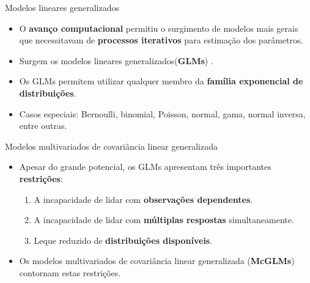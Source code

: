 \documentclass[
  ignorenonframetext,
  serif,
  professionalfont,
  usenames,
  dvipsnames,
  aspectratio = 169]{beamer}
\begin{document}
\begin{frame}{Modelos lineares generalizados}
\protect\hypertarget{modelos-lineares-generalizados}{}
\begin{itemize}
    \itemsep 2ex

  \item O \textbf{avanço computacional} permitiu o surgimento de modelos mais gerais que necessitavam de \textbf{processos iterativos} para estimação dos parâmetros. 
  
  \item Surgem os modelos lineares generalizados(\textbf{GLMs}) \citep{Nelder72}. 
  
  \item Os GLMs permitem utilizar qualquer membro da \textbf{família exponencial de distribuições}.

  \item Casos especiais: Bernoulli, binomial, Poisson, normal, gama, normal inversa, entre outras.
  
  \end{itemize}
\end{frame}

\begin{frame}{Modelos multivariados de covariância linear generalizada}
\protect\hypertarget{modelos-multivariados-de-covariuxe2ncia-linear-generalizada}{}
\begin{itemize}
    \itemsep 2ex
  
  \item Apesar do grande potencial, os GLMs apresentam três importantes \textbf{restrições}:
    \begin{enumerate}
      \itemsep 2ex
    
      \item A incapacidade de lidar com \textbf{observações dependentes}. 
      \item A incapacidade de lidar com \textbf{múltiplas respostas} simultaneamente.
      \item Leque reduzido de \textbf{distribuições disponíveis}. 
    \end{enumerate}

  \item Os modelos multivariados de covariância linear generalizada (\textbf{McGLMs}) \citep{Bonat16} contornam estas restrições.

  \end{itemize}
\end{frame}
\end{document}
